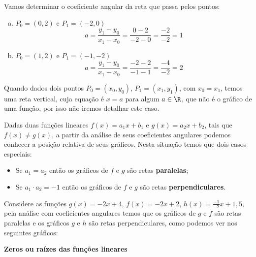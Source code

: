  \begin{exem}
  Vamos determinar o coeficiente angular da reta que passa pelos pontos:
   \begin{enumerate}[a)]
    \item $P_0=(0,2)$ e $P_1=(-2,0)$
\begin{equation}
a= \frac{y_1 - y_0}{x_1 - x_0}= \frac{0 - 2}{-2 - 0}= \frac{-2}{-2}= 1
\end{equation}
    \item $P_0=(1,2)$ e $P_1=(-1,-2)$
\begin{equation}
a= \frac{y_1 - y_0}{x_1 - x_0}= \frac{-2 - 2}{-1 - 1}= \frac{-4}{-2}= 2
\end{equation}
   \end{enumerate}

  \end{exem}

  Quando dados dois pontos $P_0=(x_0, y_0)$, $P_1=(x_1, y_1)$, com $x_0 = x_1$, temos uma reta vertical, cuja equação é $x= a$ para algum $a \in \R$, que não é o gráfico de uma função, por isso não iremos detalhar este caso.

  Dadas duas funções lineares $f(x)=a_1 x + b_1$ e $g(x)= a_2 x + b_2$, tais que $f(x) \neq g(x)$, a partir da análise de seus coeficientes angulares podemos conhecer a posição relativa de seus gráficos. Nesta situação temos que dois casos especiais:
  \begin{itemize}
  \item Se $a_1= a_2$ então os gráficos de $f$ e $g$ são retas \textbf{paralelas};
  \item Se $a_1 \cdot a_2= -1$ então os gráficos de $f$ e $g$ são retas \textbf{perpendiculares}.
  \end{itemize}

  \begin{exem}
  Considere as funções $g(x)= -2x+4$, $f(x)= -2x+2$, $h(x)= \frac{-1}{-2}x+ 1,5$, pela análise com coeficientes angulares temos que os gráficos de $g$ e $f$ são retas paralelas e os gráficos $g$ e $h$ são retas perpendiculares, como podemos ver nos seguintes gráficos:
     \begin{figure}[H]
  \end{figure}
  \end{exem}


\vskip0.3cm
 \textbf{Zeros ou raízes das funções lineares}

